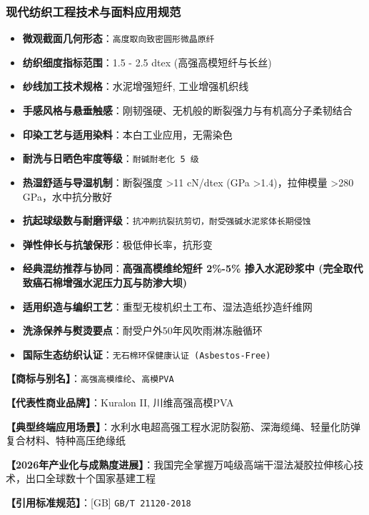 \documentclass[11pt,openright,twoside,UTF8]{ctexbook}
\begin{document}
\subsubsection*{现代纺织工程技术与面料应用规范}
\begin{itemize} \setlength{\itemsep}{2pt}
    \item \textbf{微观截面几何形态}：\texttt{高度取向致密圆形微晶原纤}
    \item \textbf{纺织细度指标范围}：1.5 - 2.5 dtex (高强高模短纤与长丝)
    \item \textbf{纱线加工技术规格}：水泥增强短纤, 工业增强机织线
    \item \textbf{手感风格与悬垂触感}：刚韧强硬、无机般的断裂强力与有机高分子柔韧结合
    \item \textbf{印染工艺与适用染料}：本白工业应用，无需染色
    \item \textbf{耐洗与日晒色牢度等级}：\texttt{耐碱耐老化 5 级}
    \item \textbf{热湿舒适与导湿机制}：断裂强度 \textgreater{}11 cN/dtex (GPa \textgreater{}1.4)，拉伸模量 \textgreater{}280 GPa，水中抗分散好
    \item \textbf{抗起球级数与耐磨评级}：\texttt{抗冲刷抗裂抗剪切，耐受强碱水泥浆体长期侵蚀}
    \item \textbf{弹性伸长与抗皱保形}：极低伸长率，抗形变
    \item \textbf{经典混纺推荐与协同}：\textbf{高强高模维纶短纤 2\%-5\% 掺入水泥砂浆中 (完全取代致癌石棉增强水泥压力瓦与防渗大坝)}
    \item \textbf{适用织造与编织工艺}：重型无梭机织土工布、湿法造纸抄造纤维网
    \item \textbf{洗涤保养与熨烫要点}：耐受户外50年风吹雨淋冻融循环
    \item \textbf{国际生态纺织认证}：\texttt{无石棉环保健康认证 (Asbestos-Free)}
\end{itemize}
\vspace{0.2cm}

\noindent\textbf{【商标与别名】}：\texttt{高强高模维纶}、\texttt{高模PVA}\par
\noindent\textbf{【代表性商业品牌】}：Kuralon II, 川维高强高模PVA\par
\noindent\textbf{【典型终端应用场景】}：水利水电超高强工程水泥防裂筋、深海缆绳、轻量化防弹复合材料、特种高压绝缘纸\par
\noindent\textbf{【2026年产业化与成熟度进展】}：我国完全掌握万吨级高端干湿法凝胶拉伸核心技术，出口全球数十个国家基建工程\par
\noindent\textbf{【引用标准规范】}：[GB] \texttt{GB/T 21120-2018}\par
\vspace{0.5cm}
\end{document}
